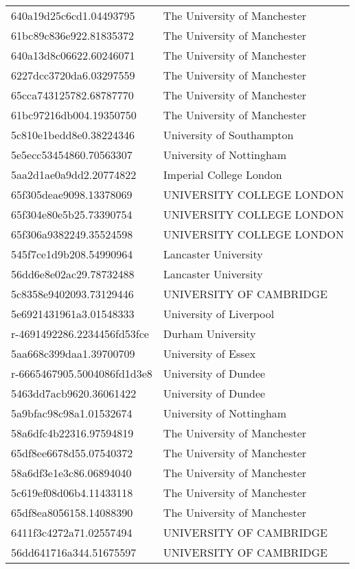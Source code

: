 \begin{tabular}{ll}
640a19d25c6cd1.04493795 & The University of Manchester \\
61bc89c836e922.81835372 & The University of Manchester \\
640a13d8c06622.60246071 & The University of Manchester \\
6227dcc3720da6.03297559 & The University of Manchester \\
65cca743125782.68787770 & The University of Manchester \\
61bc97216db004.19350750 & The University of Manchester \\
5c810e1bedd8e0.38224346 & University of Southampton \\
5e5ecc53454860.70563307 & University of Nottingham \\
5aa2d1ae0a9dd2.20774822 & Imperial College London \\
65f305deae9098.13378069 & UNIVERSITY COLLEGE LONDON \\
65f304e80e5b25.73390754 & UNIVERSITY COLLEGE LONDON \\
65f306a9382249.35524598 & UNIVERSITY COLLEGE LONDON \\
545f7ce1d9b208.54990964 & Lancaster University \\
56dd6e8e02ac29.78732488 & Lancaster University \\
5c8358e9402093.73129446 & UNIVERSITY OF CAMBRIDGE \\
5e6921431961a3.01548333 & University of Liverpool \\
r-4691492286.2234456fd53fce & Durham University \\
5aa668c399daa1.39700709 & University of Essex \\
r-6665467905.5004086fd1d3e8 & University of Dundee \\
5463dd7acb9620.36061422 & University of Dundee \\
5a9bfac98c98a1.01532674 & University of Nottingham \\
58a6dfc4b22316.97594819 & The University of Manchester \\
65df8ee6678d55.07540372 & The University of Manchester \\
58a6df3e1e3c86.06894040 & The University of Manchester \\
5c619ef08d06b4.11433118 & The University of Manchester \\
65df8ea8056158.14088390 & The University of Manchester \\
6411f3c4272a71.02557494 & UNIVERSITY OF CAMBRIDGE \\
56dd641716a344.51675597 & UNIVERSITY OF CAMBRIDGE \\

\end{tabular}
